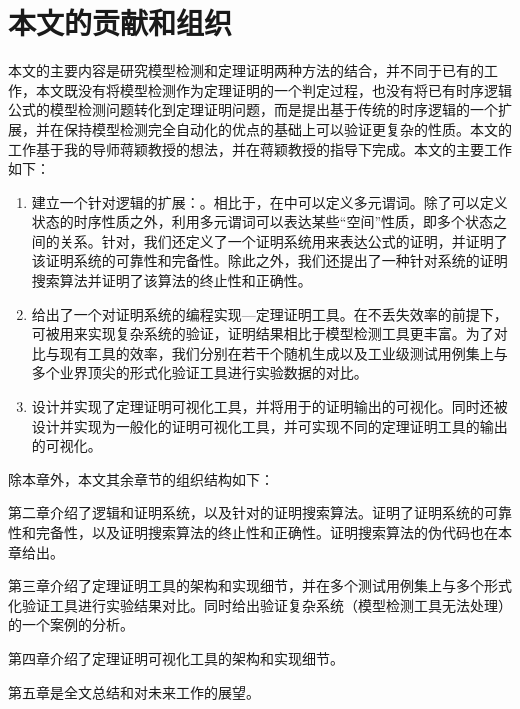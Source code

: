 \section{本文的贡献和组织}
本文的主要内容是研究模型检测和定理证明两种方法的结合，并不同于已有的工作，本文既没有将模型检测作为定理证明的一个判定过程，也没有将已有时序逻辑公式的模型检测问题转化到定理证明问题，而是提出基于传统的时序逻辑的一个扩展，并在保持模型检测完全自动化的优点的基础上可以验证更复杂的性质。本文的工作基于我的导师蒋颖教授的想法，并在蒋颖教授的指导下完成。本文的主要工作如下：
\begin{enumerate}
	\item 建立一个针对\CTL{}逻辑的扩展：\CTLP{}。相比于\CTL{}，在\CTLP{}中可以定义多元谓词。除了可以定义状态的时序性质之外，利用多元谓词可以表达某些“空间”性质，即多个状态之间的关系。针对\CTLP{}，我们还定义了一个证明系统\SCTL{}用来表达\CTLP{}公式的证明，并证明了该证明系统的可靠性和完备性。除此之外，我们还提出了一种针对\SCTL{}系统的证明搜索算法并证明了该算法的终止性和正确性。
	\item 给出了一个对证明系统\SCTL{}的编程实现---定理证明工具\sctlprov{}。在不丢失效率的前提下，\sctlprov{}可被用来实现复杂系统的验证，证明结果相比于模型检测工具更丰富。为了对比\sctlprov{}与现有工具的效率，我们分别在若干个随机生成以及工业级测试用例集上与多个业界顶尖的形式化验证工具进行实验数据的对比。
	\item 设计并实现了定理证明可视化工具，并将用于\sctlprov{}的证明输出的可视化。同时还被设计并实现为一般化的证明可视化工具，并可实现不同的定理证明工具的输出的可视化。
\end{enumerate}

除本章外，本文其余章节的组织结构如下：

第二章介绍了\CTLP{}逻辑和证明系统\SCTL{}，以及针对\SCTL{}的证明搜索算法。证明了\SCTL{}证明系统的可靠性和完备性，以及证明搜索算法的终止性和正确性。证明搜索算法的伪代码也在本章给出。

第三章介绍了定理证明工具\sctlprov{}的架构和实现细节，并在多个测试用例集上与多个形式化验证工具进行实验结果对比。同时给出\sctlprov{}验证复杂系统（模型检测工具无法处理）的一个案例的分析。

第四章介绍了定理证明可视化工具的架构和实现细节。

第五章是全文总结和对未来工作的展望。